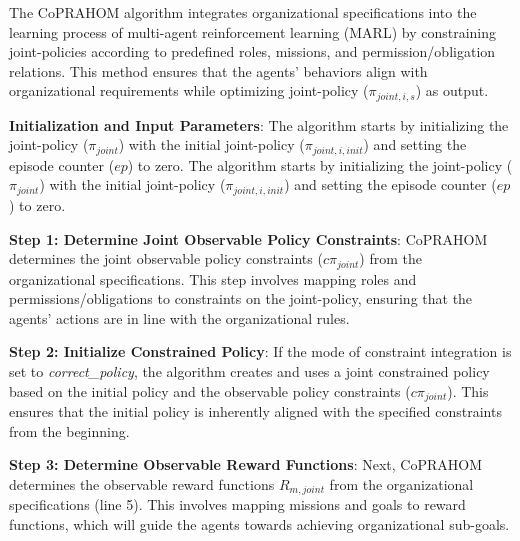 \documentclass[conference]{IEEEtran}
\newcounter{relation}
\begin{document}


The CoPRAHOM algorithm integrates organizational specifications into the learning process of multi-agent reinforcement learning (MARL) by constraining joint-policies according to predefined roles, missions, and permission/obligation relations. This method ensures that the agents' behaviors align with organizational requirements while optimizing joint-policy ($\pi_{joint,i,s}$) as output.

\textbf{Initialization and Input Parameters}: \quad
The algorithm starts by initializing the joint-policy ($\pi_{joint}$) with the initial joint-policy ($\pi_{joint,i,init}$) and setting the episode counter ($ep$) to zero.
The algorithm starts by initializing the joint-policy ($\pi_{joint}$) with the initial joint-policy ($\pi_{joint,i,init}$) and setting the episode counter ($ep$) to zero.

\textbf{Step 1: Determine Joint Observable Policy Constraints}: \quad
CoPRAHOM determines the joint observable policy constraints ($c\pi_{joint}$) from the organizational specifications. This step involves mapping roles and permissions/obligations to constraints on the joint-policy, ensuring that the agents' actions are in line with the organizational rules.

\textbf{Step 2: Initialize Constrained Policy}: \quad
If the mode of constraint integration is set to \textit{correct\_policy}, the algorithm creates and uses a joint constrained policy based on the initial policy and the observable policy constraints ($c\pi_{joint}$). This ensures that the initial policy is inherently aligned with the specified constraints from the beginning.

\textbf{Step 3: Determine Observable Reward Functions}: \quad
Next, CoPRAHOM determines the observable reward functions $R_{m,joint}$ from the organizational specifications (line 5). This involves mapping missions and goals to reward functions, which will guide the agents towards achieving organizational sub-goals.
\end{document}
